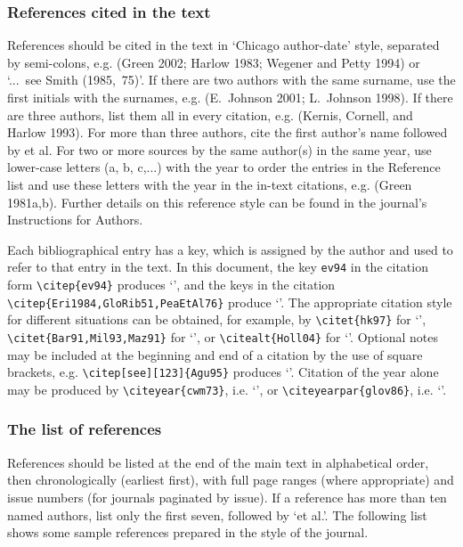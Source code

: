 \documentclass{tBPS2e}
\theoremstyle{plain}
\theoremstyle{definition}
\theoremstyle{remark}
\begin{document}
\subsubsection{References cited in the text}

References should be cited in the text in `Chicago author-date' style, separated by semi-colons, e.g. (Green 2002; Harlow 1983; Wegener and Petty 1994) or `...~see Smith (1985,~75)'. If there are two authors with the same surname, use the first initials with the surnames, e.g. (E.~Johnson 2001; L.~Johnson 1998). If there are three authors, list them all in every citation, e.g. (Kernis, Cornell, and Harlow 1993). For more than three authors, cite the first author's name followed by et al. For two or more sources by the same author(s) in the same year, use lower-case letters (a, b, c,...) with the year to order the entries in the Reference list and use these letters with the year in the in-text citations, e.g. (Green 1981a,b). Further details on this reference style can be found in the journal's Instructions for Authors.

Each bibliographical entry has a key, which is assigned by the author and used to refer to that entry in the text. In this document, the key \verb"ev94" in the citation form \verb"\citep{ev94}" produces `\citep{ev94}', and the keys in the citation \verb"\citep{Eri1984,GloRib51,PeaEtAl76}" produce `\citep{Eri1984,GloRib51,PeaEtAl76}'. The appropriate citation style for different situations can be obtained, for example, by \verb"\citet{hk97}" for `\citet{hk97}', \verb"\citet{Bar91,Mil93,Maz91}" for `\citet{Bar91,Mil93,Maz91}', or \verb"\citealt{Holl04}" for `\citealt{Holl04}'. Optional notes may be included at the beginning and end of a citation by the use of square brackets, e.g. \verb"\citep[see][123]{Agu95}" produces `\citep[see][123]{Agu95}'. Citation of the year alone may be produced by \verb"\citeyear{cwm73}", i.e. `\citeyear{cwm73}', or \verb"\citeyearpar{glov86}", i.e. `\citeyearpar{glov86}'.

\subsubsection{The list of references}

References should be listed at the end of the main text in alphabetical order, then chronologically (earliest first), with full page ranges (where appropriate) and issue numbers (for journals paginated by issue). If a reference has more than ten named authors, list only the first seven, followed by `et al.'. The following list shows some sample references prepared in the style of the journal.
\end{document}
